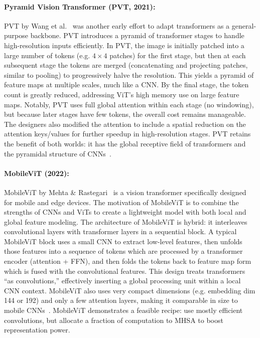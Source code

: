 \documentclass[runningheads,a4paper]{llncs}
\begin{document}
\paragraph{Pyramid Vision Transformer (PVT, 2021):} PVT by Wang et al.~\cite{wang2021pvt} was another early effort to adapt transformers as a general-purpose backbone. PVT introduces a pyramid of transformer stages to handle high-resolution inputs efficiently. In PVT, the image is initially patched into a large number of tokens (e.g. $4\times4$ patches) for the first stage, but then at each subsequent stage the tokens are merged (concatenating and projecting patches, similar to pooling) to progressively halve the resolution. This yields a pyramid of feature maps at multiple scales, much like a CNN. By the final stage, the token count is greatly reduced, addressing ViT’s high memory use on large feature maps. Notably, PVT uses full global attention within each stage (no windowing), but because later stages have few tokens, the overall cost remains manageable. The designers also modified the attention to include a spatial reduction on the attention keys/values for further speedup in high-resolution stages. PVT retains the benefit of both worlds: it has the global receptive field of transformers and the pyramidal structure of CNNs~\cite{wang2021pvt}.

\paragraph{MobileViT (2022):} MobileViT by Mehta \& Rastegari~\cite{mehta2022mobilevit} is a vision transformer specifically designed for mobile and edge devices. The motivation of MobileViT is to combine the strengths of CNNs and ViTs to create a lightweight model with both local and global feature modeling. The architecture of MobileViT is hybrid: it interleaves convolutional layers with transformer layers in a sequential block. A typical MobileViT block uses a small CNN to extract low-level features, then unfolds those features into a sequence of tokens which are processed by a transformer encoder (attention + FFN), and then folds the tokens back to feature map form which is fused with the convolutional features. This design treats transformers “as convolutions,” effectively inserting a global processing unit within a local CNN context. MobileViT also uses very compact dimensions (e.g. embedding dim 144 or 192) and only a few attention layers, making it comparable in size to mobile CNNs~\cite{mehta2022mobilevit}. MobileViT demonstrates a feasible recipe: use mostly efficient convolutions, but allocate a fraction of computation to MHSA to boost representation power.
\end{document}
